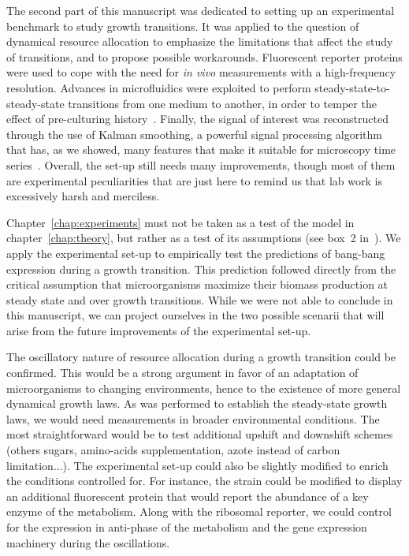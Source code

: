 The second part of this manuscript was dedicated to setting up an experimental benchmark to study growth transitions.
It was applied to the question of dynamical resource allocation to emphasize the limitations that affect the study of transitions, and to propose possible workarounds.
Fluorescent reporter proteins were used to cope with the need for \textit{in vivo} measurements with a high-frequency resolution.
Advances in microfluidics were exploited to perform steady-state-to-steady-state transitions from one medium to another, in order to temper the effect of pre-culturing history~\cite{ng_damage_1962,dufrenne_effect_1997,shaw_effect_1967}.
Finally, the signal of interest was reconstructed through the use of Kalman smoothing, a powerful signal processing algorithm that has, as we showed, many features that make it suitable for microscopy time series~\cite{kailath_linear_2000,jazwinski_stochastic_2007,kalman_new_1960}.
Overall, the set-up still needs many improvements, though most of them are experimental peculiarities that are just here to remind us that lab work is excessively harsh and merciless.

Chapter~\ref{chap:experiments} must not be taken as a test of the model in chapter~\ref{chap:theory}, but rather as a test of its assumptions (see box~2 in~\cite{servedio_not_2014}).
We apply the experimental set-up to empirically test the predictions of bang-bang expression during a growth transition.
This prediction followed directly from the critical assumption that microorganisms maximize their biomass production at steady state and over growth transitions.
While we were not able to conclude in this manuscript, we can project ourselves in the two possible scenarii that will arise from the future improvements of the experimental set-up.

The oscillatory nature of resource allocation during a growth transition could be confirmed.
This would be a strong argument in favor of an adaptation of microorganisms to changing environments, hence to the existence of more general dynamical growth laws.
As was performed to establish the steady-state growth laws, we would need measurements in broader environmental conditions.
The most straightforward would be to test additional upshift and downshift schemes (others sugars, amino-acids supplementation, azote instead of carbon limitation...).
The experimental set-up could also be slightly modified to enrich the conditions controlled for.
For instance, the strain could be modified to display an additional fluorescent protein that would report the abundance of a key enzyme of the metabolism.
Along with the ribosomal reporter, we could control for the expression in anti-phase of the metabolism and the gene expression machinery during the oscillations.

